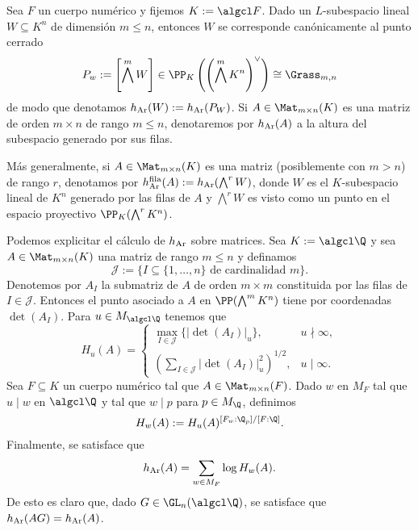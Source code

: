 \documentclass[teoria-numeros.tex]{subfiles}
\begin{document}
\begin{mydef}
	Sea $F$ un cuerpo numérico y fijemos $K := \algcl F$.
	Dado un $L$-subespacio lineal $W \subseteq K^n$ de dimensión $m \le n$, entonces $W$ se corresponde canónicamente al punto cerrado
	$$ P_w := \left[ \bigwedge^m W \right] \in \PP_K\left( \left( \bigwedge^m K^n \right)^\vee \right) \cong \Grass_{m, n} $$
	de modo que denotamos $h_{\mathrm{Ar}}(W) := h_{\mathrm{Ar}}(P_W)$.
	Si $A \in \Mat_{m\times n}(K)$ es una matriz de orden $m\times n$ de rango $m \le n$,
	denotaremos por $h_{\mathrm{Ar}}(A)$ a la altura del subespacio generado por sus filas.

	Más generalmente, si $A \in \Mat_{m\times n}(K)$ es una matriz (posiblemente con $m > n$) de rango $r$,
	denotamos por $h_{\mathrm{Ar}}^{\rm fila}(A) := h_{\mathrm{Ar}}(\bigwedge^r W)$, donde $W$ es el $K$-subespacio lineal de $K^n$ generado por las filas de $A$
	y $\bigwedge^r W$ es visto como un punto en el espacio proyectivo $\PP_K( \bigwedge^r K^n )$.
\end{mydef}
\begin{obs}
	Podemos explicitar el cálculo de $h_{\mathrm{Ar}}$ sobre matrices.
	Sea $K := \algcl\Q$ y sea $A \in \Mat_{m\times n}(K)$ una matriz de rango $m \le n$ y definamos
	$$ \mathcal{J} := \{ I \subseteq \{ 1, \dots, n \} \text{ de cardinalidad } m \}. $$
	Denotemos por $A_I$ la submatriz de $A$ de orden $m\times m$ constituida por las filas de $I \in \mathcal{J}$.
	Entonces el punto asociado a $A$ en $\PP( \bigwedge^m K^n )$ tiene por coordenadas $\det(A_I)$.
	Para $u \in M_{\algcl\Q}$ tenemos que
	\[
		H_u(A) =
		\begin{cases}
			\max_{I \in \mathcal{J}} \{ |\det(A_I)|_u \}, & u \nmid \infty, \\
			\left( \sum_{I\in \mathcal{J}} |\det(A_I)|_u^2 \right)^{1/2}, & u \mid \infty.
		\end{cases}
	\]
	Sea $F \subseteq K$ un cuerpo numérico tal que $A \in \Mat_{m\times n}(F)$.
	Dado $w$ en $M_F$ tal que $u \mid w$ en $\algcl\Q$ y tal que $w \mid p$ para $p \in M_\Q$, definimos
	$$ H_w(A) := H_u(A)^{ [F_w : \Q_p] / [F : \Q] }. $$
	Finalmente, se satisface que
	$$ h_{\mathrm{Ar}}(A) = \sum_{w \in M_F} \log H_w(A). $$
	De esto es claro que, dado $G \in \GL_n(\algcl\Q)$, se satisface que $h_{\mathrm{Ar}}(AG) = h_{\mathrm{Ar}}(A)$.
\end{obs}
\end{document}
